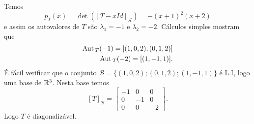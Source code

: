 \begin{exemplo}
\begin{enumerate}
		\begin{solucao}
		Temos
		\[
				p_T(x) = \det([T - xId]_\mathcal{A}) = -(x + 1)^2(x + 2)
			\]
			e assim os autovalores de $T$ s\~ao $\lambda_1 = -1$ e $\lambda_2 = -2$. C\'alculos simples mostram que
			\begin{align*}
				{\rm Aut\,}_T(-1) = [(1,0,2); (0,1,2)]\\
				{\rm Aut\,}_T(-2) = [(1,-1,1)].
			\end{align*}
			\'E f\'acil verificar que o conjunto $\mathcal{B} = \{(1,0,2); (0,1,2); (1,-1,1)\}$ \'e L.I, logo uma base de $\mathbb{R}^3$. Nesta base temos
			\[
				[T]_\mathcal{B} = \begin{bmatrix}
								-1 & 0 & 0\\
								0 & -1 & 0\\
								0 & 0 & -2
							\end{bmatrix}.
			\]
			Logo $T$ \'e diagonaliz\'avel.
		\end{solucao}
	\end{enumerate}
\end{exemplo}

